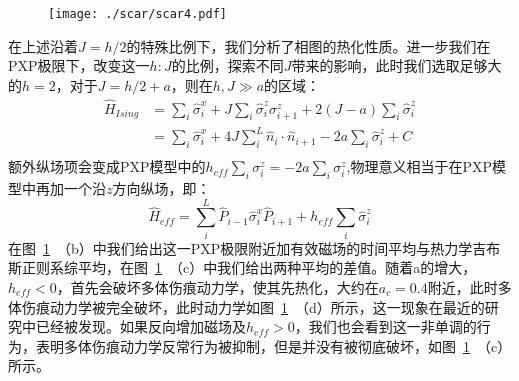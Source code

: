 \begin{figure}[h]
\centering
\texttt{[image: ./scar/scar4.pdf]}
\label{h04}
\end{figure}
在上述沿着$J=h/2$的特殊比例下，我们分析了相图的热化性质。进一步我们在PXP极限下，改变这一$h:J$的比例，探索不同$J$带来的影响，此时我们选取足够大的$h=2$，对于$J=h/2+a$，则在$h,J\gg a$的区域：
\begin{equation}
\begin{split}
\hat{H}_{Ising}&=\sum_i\hat{\sigma}^x_i + J\sum_{i}\hat{\sigma}^z_i\sigma^z_{i+1} + 2(J-a)\sum_{i}\hat{\sigma}^z_i  \\
\quad &= \sum_i\hat{\sigma}^x_i + 4J\sum_{i}^{L} \hat{n}_i\cdot\hat{n}_{i+1} - 2a\sum_{i}\hat{\sigma}^z_i  + C\\
\end{split}
\end{equation}
额外纵场项会变成PXP模型中的$h_{eff}\sum_i\sigma^z_i = -2a\sum_i\sigma^z_i$,物理意义相当于在PXP模型中再加一个沿$z$方向纵场，即：
\begin{equation}
\hat{H}_{eff} = \sum_{i}^{L} \hat{P}_{i-1}\hat{\sigma}_i^x\hat{P}_{i+1} + h_{eff}\sum_i\hat{\sigma}^z_i 
\end{equation}
在图~\ref{h04}~（b）中我们给出这一PXP极限附近加有效磁场的时间平均与热力学吉布斯正则系综平均，在图~\ref{h04}~（c）中我们给出两种平均的差值。随着a的增大，$h_{eff}<0$，首先会破坏多体伤痕动力学，使其先热化，大约在$a_c=0.4$附近，此时多体伤痕动力学被完全破坏，此时动力学如图~\ref{h04}~（d）所示，这一现象在最近的研究中已经被发现\cite{Yao2022quantum}。如果反向增加磁场及$h_{eff}>0$，我们也会看到这一非单调的行为，表明多体伤痕动力学反常行为被抑制，但是并没有被彻底破坏，如图~\ref{h04}~（c）所示。

